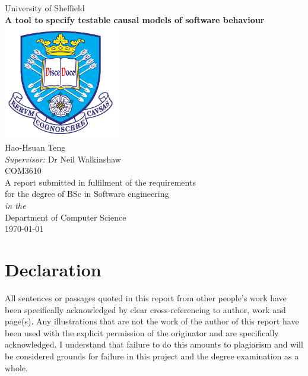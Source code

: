 \documentclass[11pt,oneside]{book}
\begin{document}
\frontmatter

\begin{titlepage}

\begin{center}
{\LARGE University of Sheffield}\\[1.5cm]
\linespread{1.2}\huge {\bfseries A tool to specify testable causal models of software behaviour}\\[1.5cm]
\linespread{1}
\includegraphics[width=5cm]{images/tuoslogo.png}\\[1cm]
{\Large Hao-Hsuan Teng}\\[1cm]
{\large \emph{Supervisor:} Dr Neil Walkinshaw}\\[1cm]
{\Large COM3610}\\[1cm]
\large A report submitted in fulfilment of the requirements\\ for the degree of BSc in Software engineering\\[0.3cm] 
\textit{in the}\\[0.3cm]
Department of Computer Science\\[2cm]
\today
\end{center}

\end{titlepage}


\newpage
\chapter*{\Large Declaration}


All sentences or passages quoted in this report from other people's work have been specifically acknowledged by clear cross-referencing to author, work and page(s). Any illustrations that are not the work of the author of this report have been used with the explicit permission of the originator and are specifically acknowledged. I understand that failure to do this amounts to plagiarism and will be considered grounds for failure in this project and the degree examination as a whole.\\[1cm]
\end{document}
